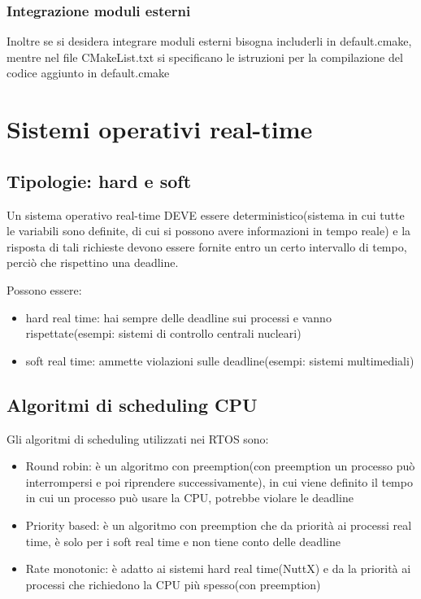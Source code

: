 \documentclass{report}
\begin{document}
\subsubsection{Integrazione moduli esterni}
Inoltre se si desidera integrare moduli esterni bisogna includerli in default.cmake, mentre nel file CMakeList.txt si specificano le istruzioni per la compilazione del codice aggiunto in default.cmake 
\section{Sistemi operativi real-time}
\subsection{Tipologie: hard e soft}
Un sistema operativo real-time DEVE essere deterministico(sistema in cui tutte le variabili sono definite, di cui si possono avere informazioni in tempo reale) e la risposta di tali richieste devono essere fornite entro un certo intervallo di tempo, perciò che rispettino una deadline. 

Possono essere:
\begin{itemize}
    \item hard real time: hai sempre delle deadline sui processi e vanno rispettate(esempi: sistemi di controllo centrali nucleari)
    \item soft real time: ammette violazioni sulle deadline(esempi: sistemi multimediali)
\end{itemize}


\subsection{Algoritmi di scheduling CPU}
Gli algoritmi di scheduling utilizzati nei RTOS sono:
\begin{itemize}
    \item Round robin: è un algoritmo con preemption(con preemption un processo può interrompersi e poi riprendere successivamente), in cui viene definito il tempo in cui un processo può usare la CPU, potrebbe violare le deadline
    \item Priority based: è un algoritmo con preemption che da priorità ai processi real time, è solo per i soft real time e non tiene conto delle deadline
    \item Rate monotonic: è adatto ai sistemi hard real time(NuttX) e da la priorità ai processi che richiedono la CPU più spesso(con preemption)

\end{itemize}
\end{document}
